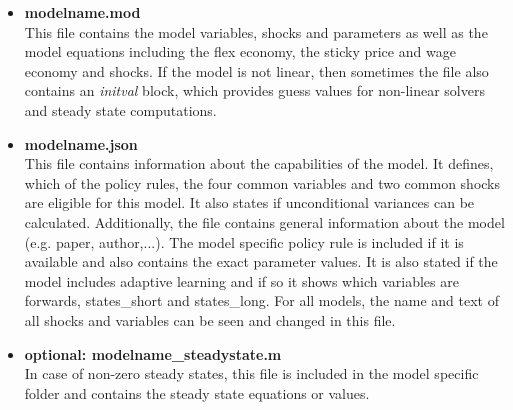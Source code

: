 \begin{itemize}
\item \textbf{modelname.mod}\\
This file contains the model variables, shocks and parameters as well as the model equations including the flex economy, the sticky price and wage economy and shocks. If the model is not linear, then sometimes the file also contains an \textit{initval} block, which provides guess values for non-linear solvers and steady state computations.
\item \textbf{modelname.json}\\
This file contains information about the capabilities of the model. It defines, which of the policy rules, the four common variables and two common shocks are eligible for this model. It also states if unconditional variances can be calculated. Additionally, the file contains general information about the model (e.g. paper, author,...). The model specific policy rule is included if it is available and also contains the exact parameter values. It is also stated if the model includes adaptive learning and if so it shows which variables are forwards, states\_short and states\_long. For all models, the name and text of all shocks and variables can be seen and changed in this file.
\item \textbf{optional: modelname\_steadystate.m}\\
In case of non-zero steady states, this file is included in the model specific folder and contains the steady state equations or values. 
\end{itemize}


